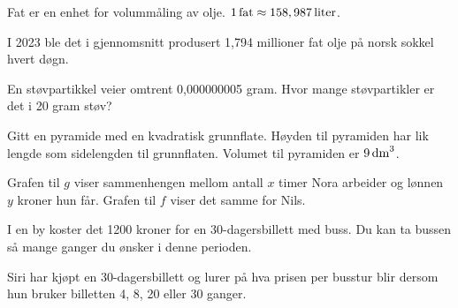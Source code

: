 Fat er en enhet for volummåling av olje. $1\,\text{fat}\approx 158,987\,\text{liter}$. \os

I 2023 ble det i gjennomsnitt produsert 1,794 millioner fat
olje på norsk sokkel hvert døgn.

En støvpartikkel veier omtrent 0,000000005 gram. 
Hvor mange støvpartikler er det i 20 gram støv?

Gitt en pyramide med en kvadratisk grunnflate. Høyden til pyramiden har lik lengde som sidelengden til grunnflaten. Volumet til pyramiden er $9\,\text{dm}^3$.

Grafen til $g$ viser sammenhengen mellom antall $x$
timer Nora arbeider og lønnen $y$ kroner hun får.
Grafen til $f$ viser det samme for Nils.

I en by koster det 1200 kroner for en 30-dagersbillett med buss.
Du kan ta bussen så mange ganger du ønsker i denne perioden.

Siri har kjøpt en 30-dagersbillett og lurer på hva prisen per busstur
blir dersom hun bruker billetten 4, 8, 20 eller 30 ganger.

